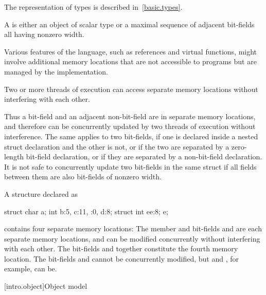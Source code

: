 \pnum
\begin{note} The representation of types is described
in~\ref{basic.types}. \end{note}

\pnum
A  is either an object of scalar type or a maximal
sequence of adjacent bit-fields all having nonzero width. \begin{note} Various
features of the language, such as references and virtual functions, might
involve additional memory locations that are not accessible to programs but are
managed by the implementation. \end{note} Two or more threads of
execution can access separate memory
locations without interfering with each other.

\pnum
\begin{note} Thus a bit-field and an adjacent non-bit-field are in separate memory
locations, and therefore can be concurrently updated by two threads of execution
without interference. The same applies to two bit-fields, if one is declared
inside a nested struct declaration and the other is not, or if the two are
separated by a zero-length bit-field declaration, or if they are separated by a
non-bit-field declaration. It is not safe to concurrently update two bit-fields
in the same struct if all fields between them are also bit-fields of nonzero
width. \end{note}

\pnum
\begin{example} A structure declared as

\begin{codeblock}
struct {
  char a;
  int b:5,
  c:11,
  :0,
  d:8;
  struct {int ee:8;} e;
}
\end{codeblock}

contains four separate memory locations: The member  and bit-fields
 and  are each separate memory locations, and can be
modified concurrently without interfering with each other. The bit-fields
 and  together constitute the fourth memory location. The
bit-fields  and  cannot be concurrently modified, but
 and , for example, can be. \end{example}%

[intro.object]{Object model}

